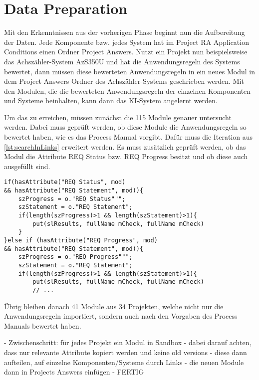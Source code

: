 \section{Data Preparation}

Mit den Erkenntnissen aus der vorherigen Phase beginnt nun die Aufbereitung der Daten. Jede Komponente bzw. jedes System hat im Project RA Application Conditions einen Ordner  Project
Answers\grqq{}. Nutzt ein Projekt nun beispielsweise das Achszähler-System AzS350U und hat die Anwendungsregeln des Systems bewertet, dann müssen diese bewerteten Anwendungsregeln in ein neues Modul 
in dem  Project Answers\grqq{} Ordner des Achszähler-Systems geschrieben werden. Mit den Modulen, die die bewerteten Anwendungsregeln der einzelnen Komponenten und Systeme beinhalten,
kann dann das KI-System angelernt werden. 

Um das zu erreichen, müssen zunächst die 115 Module genauer untersucht werden. Dabei muss geprüft werden, ob diese Module die Anwendungsregeln so bewertet haben, wie es das Process Manual vorgibt.
Dafür muss die Iteration aus \ref*{lst:searchInLinks} erweitert werden. Es muss zusätzlich geprüft werden, ob das Modul die Attribute REQ Status bzw. REQ Progress besitzt und ob diese auch 
ausgefüllt sind. 

\begin{lstlisting}[caption={Suche nach bewerteten Anwendungsregeln},captionpos=b, label = lst:searchARSolutions]                                                       
if(hasAttribute("REQ Status", mod) 
&& hasAttribute("REQ Statement", mod)){  
    szProgress = o."REQ Status""";
    szStatement = o."REQ Statement";
    if(length(szProgress)>1 && length(szStatement)>1){ 
        put(slResults, fullName mCheck, fullName mCheck)
    }
}else if (hasAttribute("REQ Progress", mod) 
&& hasAttribute("REQ Statement", mod)){
    szProgress = o."REQ Progress""";
    szStatement = o."REQ Statement";
    if(length(szProgress)>1 && length(szStatement)>1){ 
        put(slResults, fullName mCheck, fullName mCheck)
        // ...
\end{lstlisting}

Übrig bleiben danach 41 Module aus 34 Projekten, welche nicht nur die Anwendungsregeln importiert, sondern auch nach den Vorgaben des Process Manuals bewertet haben.  


- Zwischenschritt: für jedes Projekt ein Modul in Sandbox
- dabei darauf achten, dass nur relevante Attribute kopiert werden und keine old versions
- diese dann aufteilen, auf einzelne Komponenten/Systeme durch Links
- die neuen Module dann in Projects Answers einfügen
- FERTIG